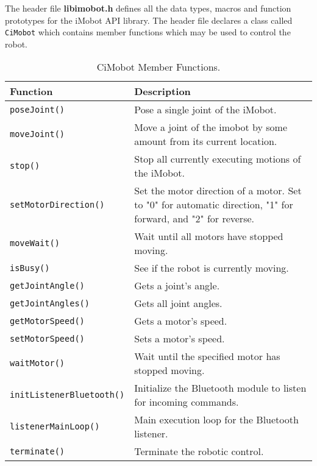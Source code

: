 \noindent
The header file {\bf libimobot.h} defines all the data types, macros 
and function prototypes for the iMobot API library. The header file
declares a class called \texttt{CiMobot} which contains member functions which
may be used to control the robot.

\begin{table}[!hp]
\capstart
\begin{center}
\caption{CiMobot Member Functions.}
\begin{tabular}{p{58 mm}p{97 mm}}
\hline
Function & Description \\
\hline
\texttt{poseJoint()} \dotfill & Pose a single joint of the iMobot. \\
\texttt{moveJoint()} \dotfill & Move a joint of the imobot by some amount from its current location. \\
\texttt{stop()} \dotfill & Stop all currently executing motions of the iMobot. \\
\texttt{setMotorDirection()} \dotfill & Set the motor direction of a motor. Set
to "0" for automatic direction, "1" for forward, and "2" for reverse. \\
\texttt{moveWait()} \dotfill & Wait until all motors have stopped moving. \\
\texttt{isBusy()} \dotfill & See if the robot is currently moving. \\
\texttt{getJointAngle()} \dotfill & Gets a joint's angle. \\
\texttt{getJointAngles()} \dotfill & Gets all joint angles. \\
\texttt{getMotorSpeed()} \dotfill & Gets a motor's speed. \\
\texttt{setMotorSpeed()} \dotfill & Sets a motor's speed. \\
\texttt{waitMotor()} \dotfill & Wait until the specified motor has stopped moving. \\
\texttt{initListenerBluetooth()} \dotfill & Initialize the Bluetooth module to
listen for incoming commands. \\
\texttt{listenerMainLoop()} \dotfill & Main execution loop for the Bluetooth listener. \\
\texttt{terminate()} \dotfill & Terminate the robotic control. \\
\hline
\end{tabular}
\end{center}
\label{mobilec_api_cbinary}
\end{table}

